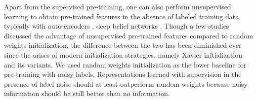 


Apart from the supervised pre-training, one can also perform unsupervised learning to obtain pre-trained features in the absence of labeled training data, typically with auto-encoders \cite{vincent2010stacked,masci2011stacked}, deep belief networks \cite{hinton2006fast,lee2009convolutional}.
Though a few studies \cite{erhan2009difficulty,erhan2010does,bengio2012deep} discussed the advantage of unsupervised pre-trained features compared to random weights initialization, the difference between the two has been diminished ever since the arises of modern initialization strategies, namely Xavier initialization \cite{glorot2010understanding} and its variants.
We used random weights initialization as the lower baseline for pre-training with noisy labels.
Representations learned with supervision in the presence of label noise should at least outperform random weights because noisy information should be still better than no information.

